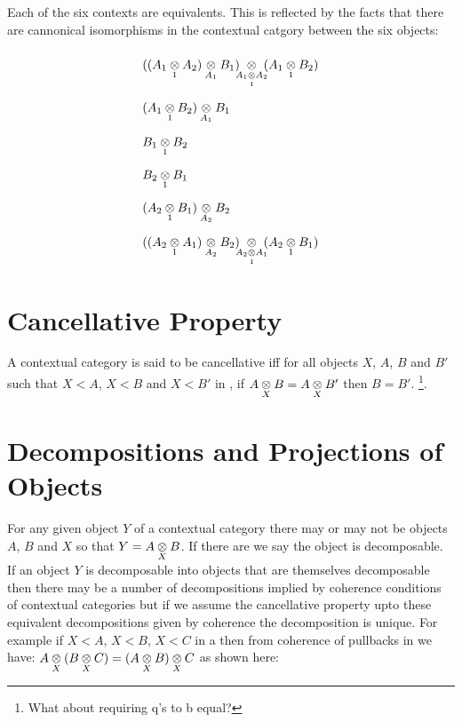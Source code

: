 \documentclass[10pt,a4paper]{scrartcl}
\begin{document}
Each of the six contexts are equivalents. This is reflected by the facts that there are cannonical 
isomorphisms in the contextual catgory between the six objects: \\
\begin{displaymath}
\def\arraystretch{2.2}
\begin{array} {l}
      \crossx
          {(\crossx
			       {(\crossx{A_1}{A_2}{1})}
						 {B_1}
						 {A_1}
			     ) 
			     \hspace{-0.2cm}
					}
					{\hspace{-0.2cm}(\crossx{A_1}{B_2}{1})}
					{\crossx{A_1}{A_2}{1}}
\\
    \crossx
       {(\crossx{A_1}{B_2}{1})}
							{B_1}
							{A_1}
\\

     \crossx{B_1}{B_2}{1}
\\
     \crossx{B_2}{B_1}{1}
\\
     \crossx
           {(\crossx{A_2}{B_1}{1})}
					 {B_2}
					 {A_2}
\\
     \crossx
              {(\crossx
							     {(\crossx{A_2}{A_1}{1})}
									 {B_2}
									 {A_2}
								) 
								\hspace{-0.2cm}
							}
							{\hspace{-0.2cm}(\crossx{A_2}{B_1}{1})}
							{\crossx{A_2}{A_1}{1}} 

\end{array}
\end{displaymath}
\section{Cancellative Property}
\noindent 
\begin{definition}
A contextual category \ccat is said to be cancellative iff for all objects $X$, $A$, $B$ and $B'$ such that
$X < A$, $X < B$ and $X < B'$ in \ccat, 
if $\crossx{A}{B}{X} = \crossx{A}{B'}{X}$ then $B=B'$. \footnote{What about requiring q's to b equal?}.
\end{definition} 


\section{Decompositions and Projections of Objects}
For any given object $Y$ of a contextual category there may or may not be objects $A$, $B$ and $X$ so that
$Y = \crossx{A}{B}{X}$. If there are we say the object is decomposable. If an object $Y$ is decomposable into objects that
are themselves decomposable then there may be a number of decompositions implied by coherence conditions of contextual
categories but if we assume the cancellative property upto these equivalent decompositions given by coherence
the decomposition is unique. 
\noindent
For example if $X < A$, $X < B$, $X < C$ in a \ccat then from coherence of pullbacks in \ccat we have:
$\crossx{A}{(\crossx{B}{C}{X})}{X} = \crossx{(\crossx{A}{B}{X})}{C}{X}$ as shown here:
 
\end{document}
